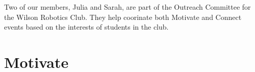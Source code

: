 

Two of our members, Julia and Sarah, are part of the Outreach Committee for the Wilson Robotics Club. They help coorinate both Motivate and Connect events based on the interests of students in the club.

\section{Motivate}

{}